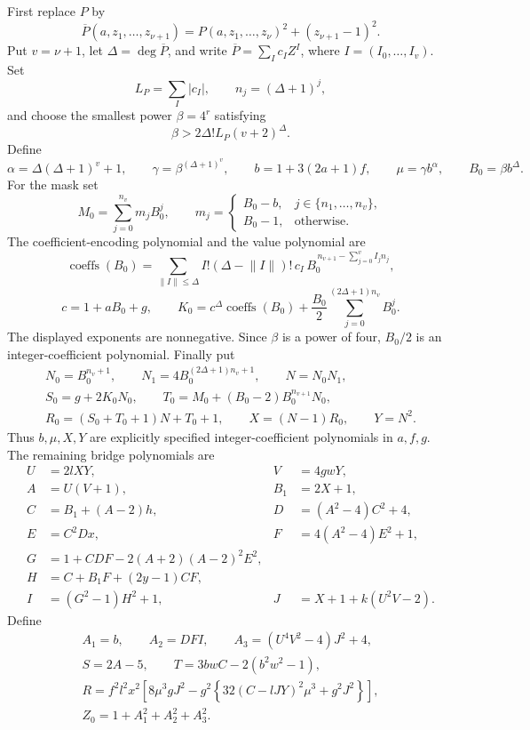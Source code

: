 \documentclass[11pt]{article}
\begin{document}
First replace \(P\) by
\[
 \overline P(a,z_1,\ldots,z_{\nu+1})
       =P(a,z_1,\ldots,z_\nu)^2+(z_{\nu+1}-1)^2.
\]
Put \(v=\nu+1\), let \(\Delta=\deg\overline P\), and write
\(\overline P=\sum_I c_I Z^I\), where \(I=(I_0,\ldots,I_v)\).
Set
\[
 L_P=\sum_I|c_I|,\qquad n_j=(\Delta+1)^j,
\]
and choose the smallest power \(\beta=4^r\) satisfying
\[
                       \beta>2\Delta!L_P(v+2)^\Delta.
\]
Define
\[
 \alpha=\Delta(\Delta+1)^v+1,\qquad
 \gamma=\beta^{(\Delta+1)^v},\qquad
 b=1+3(2a+1)f,\qquad \mu=\gamma b^\alpha,\qquad B_0=\beta b^\Delta.
\]
For the mask set
\[
 M_0=\sum_{j=0}^{n_v}m_j B_0^j,\qquad
 m_j=
 \begin{cases}
 B_0-b,&j\in\{n_1,\ldots,n_v\},\\
 B_0-1,&\text{otherwise}.
 \end{cases}
\]
The coefficient-encoding polynomial and the value polynomial are
\[
 \operatorname{coeffs}(B_0)
 =\sum_{\lVert I\rVert\le\Delta}
 I!(\Delta-\lVert I\rVert)!\,c_I\,
 B_0^{\,n_{v+1}-\sum_{j=0}^{v}I_jn_j},
\]
\[
 c=1+aB_0+g,\qquad
 K_0=c^\Delta\operatorname{coeffs}(B_0)
           +\frac{B_0}{2}\sum_{j=0}^{(2\Delta+1)n_v}B_0^j.
\]
The displayed exponents are nonnegative.  Since \(\beta\) is a power
of four, \(B_0/2\) is an integer-coefficient polynomial.  Finally put
\[
 \begin{gathered}
 N_0=B_0^{n_v+1},\qquad
 N_1=4B_0^{(2\Delta+1)n_v+1},\qquad N=N_0N_1,\\
 S_0=g+2K_0N_0,\qquad
 T_0=M_0+(B_0-2)B_0^{n_{v+1}}N_0,\\
 R_0=(S_0+T_0+1)N+T_0+1,\qquad
 X=(N-1)R_0,\qquad Y=N^2.
 \end{gathered}
\]
Thus \(b,\mu,X,Y\) are explicitly specified integer-coefficient
polynomials in \(a,f,g\).  The remaining bridge polynomials are
\begin{align*}
 U&=2lXY,& V&=4gwY,\\
 A&=U(V+1),& B_1&=2X+1,\\
 C&=B_1+(A-2)h,& D&=(A^2-4)C^2+4,\\
 E&=C^2Dx,& F&=4(A^2-4)E^2+1,\\
 G&=1+CDF-2(A+2)(A-2)^2E^2,\\
 H&=C+B_1F+(2y-1)CF,\\
 I&=(G^2-1)H^2+1,& J&=X+1+k(U^2V-2).
\end{align*}
Define
\begin{equation}\label{M3data}
 \begin{gathered}
 A_1=b,\qquad A_2=DFI,\qquad A_3=(U^4V^2-4)J^2+4,\\
 S=2A-5,\qquad T=3bwC-2(b^2w^2-1),\\
 R=f^2l^2x^2
       \left[8\mu^3gJ^2
       -g^2\left\{32(C-lJY)^2\mu^3+g^2J^2\right\}\right],\\
 Z_0=1+A_1^2+A_2^2+A_3^2.
 \end{gathered}
\end{equation}
\end{document}
